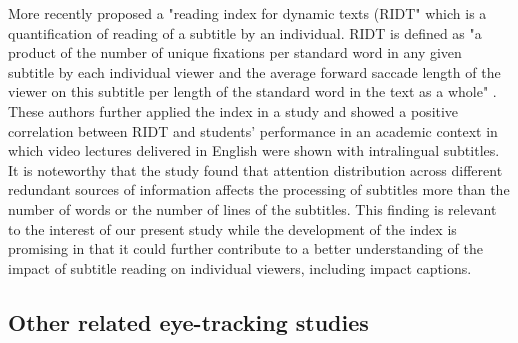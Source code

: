 \documentclass[output=paper]{langsci/langscibook}
\begin{document}
More recently \citet{Kruger2014} proposed a "reading index for dynamic texts (RIDT" which is a quantification of reading of a subtitle by an individual. RIDT is defined as "a product of the number of unique fixations per standard word in any given subtitle by each individual viewer and the average forward saccade length of the viewer on this subtitle per length of the standard word in the text as a whole" \citep[p. 110]{Kruger2014}.  These authors further applied the index in a study and showed a positive correlation between RIDT and students' performance in an academic context in which video lectures delivered in English were shown with intralingual subtitles. It is noteworthy that the study found that attention distribution across different redundant sources of information affects the processing of subtitles more than the number of words or the number of lines of the subtitles. This finding is relevant to the interest of our present study while the development of the index is promising in that it could further contribute to a better understanding of the impact of subtitle reading on individual viewers, including impact captions.


\subsection{Other related eye-tracking studies}
\end{document}
